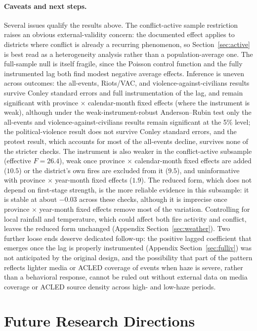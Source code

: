\documentclass[12pt]{article}
\begin{document}
\paragraph{Caveats and next steps.} Several issues qualify the results above. The conflict-active sample restriction raises an obvious external-validity concern: the documented effect applies to districts where conflict is already a recurring phenomenon, so Section~\ref{sec:active} is best read as a heterogeneity analysis rather than a population-average one. The full-sample null is itself fragile, since the Poisson control function and the fully instrumented lag both find modest negative average effects. Inference is uneven across outcomes: the all-events, Riots/VAC, and violence-against-civilians results survive Conley standard errors and full instrumentation of the lag, and remain significant with province $\times$ calendar-month fixed effects (where the instrument is weak), although under the weak-instrument-robust Anderson--Rubin test only the all-events and violence-against-civilians results remain significant at the 5\% level; the political-violence result does not survive Conley standard errors, and the protest result, which accounts for most of the all-events decline, survives none of the stricter checks. The instrument is also weaker in the conflict-active subsample (effective $F = 26.4$), weak once province $\times$ calendar-month fixed effects are added ($10.5$) or the district's own fires are excluded from it ($9.5$), and uninformative with province $\times$ year-month fixed effects ($1.9$). The reduced form, which does not depend on first-stage strength, is the more reliable evidence in this subsample: it is stable at about $-0.03$ across these checks, although it is imprecise once province $\times$ year-month fixed effects remove most of the variation. Controlling for local rainfall and temperature, which could affect both fire activity and conflict, leaves the reduced form unchanged (Appendix Section~\ref{sec:weather}). Two further loose ends deserve dedicated follow-up: the positive lagged coefficient that emerges once the lag is properly instrumented (Appendix Section~\ref{sec:fulliv}) was not anticipated by the original design, and the possibility that part of the pattern reflects lighter media or ACLED coverage of events when haze is severe, rather than a behavioral response, cannot be ruled out without external data on media coverage or ACLED source density across high- and low-haze periods.

\section{Future Research Directions}
\label{sec:future}
\end{document}
